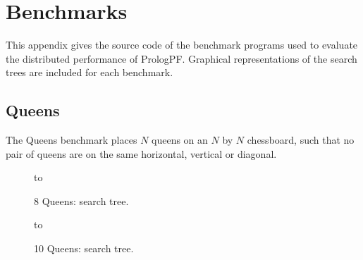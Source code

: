 \chapter{Benchmarks}
\label{benchmarks}

This appendix gives the source code of the benchmark programs used to
evaluate the distributed performance of PrologPF.  Graphical representations
of the search trees are included for each benchmark.

\section{Queens} %
\label{queens_benchmark}

The Queens benchmark places $N$ queens on an $N$ by $N$ chessboard, such that
no pair of queens are on the same horizontal, vertical or diagonal.

\begin{figure}[htb]
\vspace{5mm} \hbox to 
\caption{8 Queens: search tree.}
\vspace{5mm}
\end{figure}

\begin{figure}[htb]
\vspace{5mm} \hbox to 
\caption{10 Queens: search tree.}
\vspace{5mm}
\label{q10_tree}
\end{figure}


